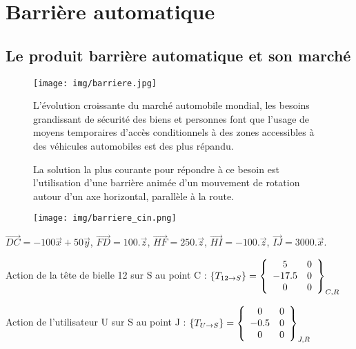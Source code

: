 

\section{Barrière automatique}

\subsection{Le produit barrière automatique et son marché}

\begin{figure}[!h]
 \begin{minipage}{0.3\linewidth}
  \centering\texttt{[image: img/barriere.jpg]}
 \end{minipage}
 \hfill
 \begin{minipage}{0.69\linewidth}
L'évolution croissante du marché automobile mondial, les besoins grandissant de sécurité des biens et personnes font que l'usage de moyens temporaires d'accès conditionnels à des zones accessibles à des véhicules automobiles est des plus répandu.

La solution la plus courante pour répondre à ce besoin est l'utilisation d'une barrière animée d'un mouvement de rotation autour d'un axe horizontal, parallèle à la route.
 \end{minipage}
\end{figure}

\begin{figure}[!h]
  \centering\texttt{[image: img/barriere\_cin.png]}
\end{figure}

$\overrightarrow{DC}=-100\overrightarrow{x}+50 \overrightarrow{y}$, $\overrightarrow{FD}=100.\overrightarrow{z}$, $\overrightarrow{HF}=250.\overrightarrow{z}$, $\overrightarrow{HI}=-100.\overrightarrow{z}$, $\overrightarrow{IJ}=3000.\overrightarrow{x}$.

Action de la tête de bielle 12 sur S au point C :
$\left\{T_{12 \rightarrow S}\right\}=\left\{\begin{array}{c c}
5 & 0 \\
-17.5 & 0 \\
0 & 0
\end{array}\right\}_{C,R}$

Action de l'utilisateur U sur S au point J :
$\left\{T_{U \rightarrow S}\right\}=\left\{\begin{array}{c c}
0 & 0 \\
-0.5 & 0 \\
0 & 0
\end{array}\right\}_{J,R}$

